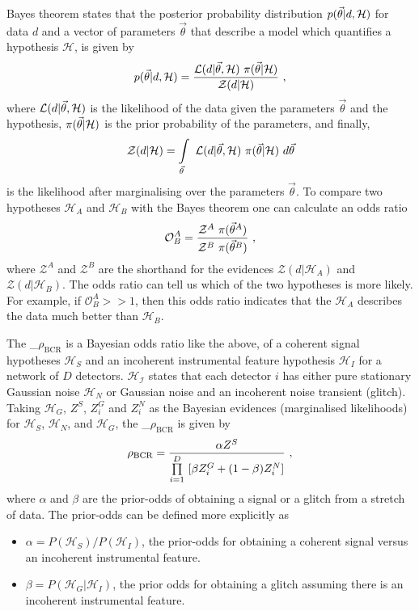\documentclass[%
 nofootinbib,
 amsmath,amssymb,
 aps,
 twocolumn
]{revtex4-2}
\newcommand{\mathcmd}[1]{{\sc \relax\ifmmode#1\else $#1$\fi}\xspace}
\newcommand{\bcr}{\mathcmd{\rho_\text{BCR}}}
\newcommand{\parameters}{\mathcmd{\vec{\theta}}}
\begin{document}
Bayes theorem states that the posterior probability distribution $p(\parameters|d,\mathcal{H})$ for data $d$ and a vector of parameters \parameters that describe a model which quantifies a hypothesis $\mathcal{H}$, is given by
\begin{equation}
p(\parameters|d,\mathcal{H}) = \frac{\mathcal{L}(d|\parameters, \mathcal{H}) \ \pi(\parameters | \mathcal{H})}{\mathcal{Z}(d|\mathcal{H})}\ , 
\end{equation}
where $\mathcal{L}(d|\parameters, \mathcal{H})$ is the likelihood of the data given the parameters \parameters and the hypothesis, $\pi(\parameters | \mathcal{H})$ is the prior probability of the parameters, and finally,
\begin{equation}
    \mathcal{Z}(d|\mathcal{H}) = \int\limits_{\parameters} \ \mathcal{L}(d|\parameters,\mathcal{H}) \ \pi(\parameters | \mathcal{H}) \ d\parameters
\end{equation} is the likelihood after marginalising over the parameters \parameters.  To compare two hypotheses $\mathcal{H}_A$ and $\mathcal{H}_B$ with the Bayes theorem one can calculate an odds ratio
\begin{equation}
    \mathcal{O}^A_B = \frac{\mathcal{Z}^A\ \pi(\parameters^A)}{\mathcal{Z}^B\ \pi(\parameters^B)}\ ,
\end{equation}
where $\mathcal{Z}^A$ and $\mathcal{Z}^B$ are the shorthand for the evidences  $\mathcal{Z}(d|\mathcal{H}_A)$ and $\mathcal{Z}(d|\mathcal{H}_B)$. The odds ratio can tell us which of the two hypotheses is more likely. For example, if $\mathcal{O}^A_B >> 1$, then this odds ratio indicates that the $\mathcal{H}_A$ describes the data much better than $\mathcal{H}_B$. 

The \bcr is a Bayesian odds ratio like the above, of a coherent signal hypotheses $\mathcal{H}_S$ and an incoherent instrumental feature hypothesis $\mathcal{H}_I$ for a network of $D$ detectors. $\mathcal{H_I}$ states that each detector $i$ has either pure stationary Gaussian noise $\mathcal{H}_N$ or Gaussian noise and an incoherent noise transient (glitch). Taking $\mathcal{H}_G$, $Z^S$, $Z^G_i$ and $Z^N_i$ as the Bayesian evidences (marginalised likelihoods) for $\mathcal{H}_S$, $\mathcal{H}_N$, and $\mathcal{H}_G$, the \bcr is given by
\begin{equation}
\label{eq:bcr}
\bcr = \frac{\alpha Z^S}{\prod\limits^D_{i=1} \ [\beta Z^G_i + (1-\beta)Z^N_i]}\ ,
\end{equation}
where $\alpha$ and $\beta$ are the prior-odds of obtaining a signal or a glitch from a stretch of data. The prior-odds can be defined more explicitly as 
\begin{itemize}
    \item $\alpha=P(\mathcal{H}_S)/P(\mathcal{H}_I)$, the prior-odds for obtaining a coherent signal versus an incoherent instrumental feature.
    \item $\beta=P(\mathcal{H}_G| \mathcal{H}_I)$, the prior odds for obtaining a glitch assuming there is an incoherent instrumental feature.
\end{itemize}
\end{document}
